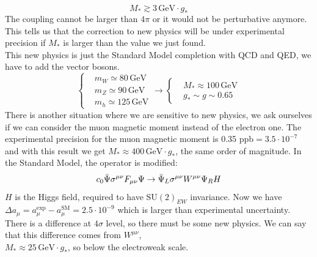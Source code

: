 \documentclass[../main.tex]{subfiles}
\begin{document}
\begin{example}
\[
M_*\gtrsim3\,\text{GeV}\cdot g_*
\]
The coupling cannot be larger than $4\pi$ or it would not be perturbative anymore. This tells us that the correction to new physics will be under experimental precision if $M_*$ is larger than the value we just found.\\
This new physics is just the Standard Model completion with QCD and QED, we have to add the vector bosons.
\[
\left\{
\begin{aligned}
&m_W\simeq80\,\text{GeV}\\
&m_Z\simeq90\,\text{GeV}\\
&m_h\simeq125\,\text{GeV}
\end{aligned}
\right.
\to
\left\{
\begin{aligned}
&M_*\approx100\,\text{GeV}\\
&g_*\sim g\sim0.65
\end{aligned}
\right.
\]
There is another situation where we are sensitive to new physics, we ask ourselves if we can consider the muon magnetic moment instead of the electron one. The experimental precision for the muon magnetic moment is 0.35 ppb$=3.5\cdot10^{-7}$ and with this result we get $M_*\approx400\,\text{GeV}\cdot g_*$, the same order of magnitude. In the Standard Model, the operator is modified:
\[
c_0\Bar{\Psi}\sigma^{\mu\nu}F_{\mu\nu}\Psi\to\Bar{\Psi}_L\sigma^{\mu\nu}W^{\mu\nu}\Psi_RH
\]
$H$ is the Higgs field, required to have SU$(2)_{EW}$ invariance. Now we have $\Delta a_\mu=a_\mu^{\text{exp}}-a_\mu^{\text{SM}}=2.5\cdot10^{-9}$ which is larger than experimental uncertainty. There is a difference at $4\sigma$ level, so there must be some new physics. We can say that this difference comes from $W^{\mu\nu}$,\\
$M_*\approx25\,\text{GeV}\cdot g_*$, so below the electroweak scale.
\end{example}
\end{document}
